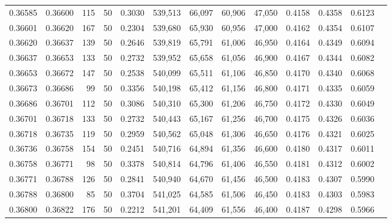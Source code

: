\begin{tabular}{rrrrrrrrrrrrr}
0.36585 & 0.36600 &   115 &  50 &                                     0.3030 & 539,513 &  66,097 &  60,906 &  47,050 & 0.4158 & 0.4358 & 0.6123 \\
0.36601 & 0.36620 &   167 &  50 &                                     0.2304 & 539,680 &  65,930 &  60,956 &  47,000 & 0.4162 & 0.4354 & 0.6107 \\
0.36620 & 0.36637 &   139 &  50 &                                     0.2646 & 539,819 &  65,791 &  61,006 &  46,950 & 0.4164 & 0.4349 & 0.6094 \\
0.36637 & 0.36653 &   133 &  50 &                                     0.2732 & 539,952 &  65,658 &  61,056 &  46,900 & 0.4167 & 0.4344 & 0.6082 \\
0.36653 & 0.36672 &   147 &  50 &                                     0.2538 & 540,099 &  65,511 &  61,106 &  46,850 & 0.4170 & 0.4340 & 0.6068 \\
0.36673 & 0.36686 &    99 &  50 &                                     0.3356 & 540,198 &  65,412 &  61,156 &  46,800 & 0.4171 & 0.4335 & 0.6059 \\
0.36686 & 0.36701 &   112 &  50 &                                     0.3086 & 540,310 &  65,300 &  61,206 &  46,750 & 0.4172 & 0.4330 & 0.6049 \\
0.36701 & 0.36718 &   133 &  50 &                                     0.2732 & 540,443 &  65,167 &  61,256 &  46,700 & 0.4175 & 0.4326 & 0.6036 \\
0.36718 & 0.36735 &   119 &  50 &                                     0.2959 & 540,562 &  65,048 &  61,306 &  46,650 & 0.4176 & 0.4321 & 0.6025 \\
0.36736 & 0.36758 &   154 &  50 &                                     0.2451 & 540,716 &  64,894 &  61,356 &  46,600 & 0.4180 & 0.4317 & 0.6011 \\
0.36758 & 0.36771 &    98 &  50 &                                     0.3378 & 540,814 &  64,796 &  61,406 &  46,550 & 0.4181 & 0.4312 & 0.6002 \\
0.36771 & 0.36788 &   126 &  50 &                                     0.2841 & 540,940 &  64,670 &  61,456 &  46,500 & 0.4183 & 0.4307 & 0.5990 \\
0.36788 & 0.36800 &    85 &  50 &                                     0.3704 & 541,025 &  64,585 &  61,506 &  46,450 & 0.4183 & 0.4303 & 0.5983 \\
0.36800 & 0.36822 &   176 &  50 &                                     0.2212 & 541,201 &  64,409 &  61,556 &  46,400 & 0.4187 & 0.4298 & 0.5966 \\

\end{tabular}
